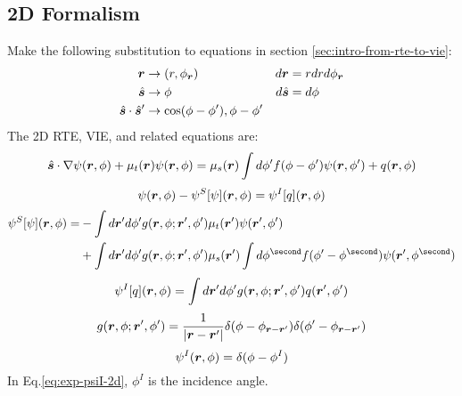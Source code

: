 \documentclass [10pt,letterpaper]{article}
\renewcommand{\vec}{\vectorsym}
\newcommand{\unitvec}[1]{\hat{\vec{#1}}}
\newcommand{\grad}{\nabla}
\begin{document}
\subsection{2D Formalism}
\label{sub:2d-formalism}
Make the following substitution to equations in section \ref{sec:intro-from-rte-to-vie}:
\begin{align*}
	\vec{r} & \rightarrow(r,\phi_{\vec{r}}) & d\vec{r} &= r dr d\phi_{\vec{r}} \\
	\unitvec{s} & \rightarrow\phi & d\unitvec{s} &= d\phi \\
	\unitvec{s}\cdot\unitvec{s}^\prime & \rightarrow \cos(\phi-\phi^\prime), \phi-\phi^\prime
\end{align*}
The 2D RTE, VIE, and related equations are:
\begin{equation} \label{eq:def-rte-2d}
	\unitvec{s}\cdot\grad\psi(\vec{r},\phi)
	+\mu_t(\vec{r})\psi(\vec{r},\phi)
	=\mu_s(\vec{r})\int d\phi^\prime f(\phi-\phi^\prime)\psi(\vec{r},\phi^\prime)
	+q(\vec{r},\phi)
\end{equation}
\begin{equation} \label{eq:short-vie-2d}
	\psi(\vec{r},\phi)
	-\psi^S[\psi](\vec{r},\phi)
	=\psi^I[q](\vec{r},\phi)
\end{equation}
\begin{equation} \label{eq:def-psiS-2d}
	\begin{split}
		\psi^S[\psi](\vec{r},\phi)=
		&-\int d\vec{r}^\prime d\phi^\prime
		g(\vec{r},\phi;\vec{r}^\prime,\phi^\prime)
		\mu_t(\vec{r}^\prime) \psi(\vec{r}^\prime,\phi^\prime)
		\\ 
		&+\int d\vec{r}^\prime d\phi^\prime
		g(\vec{r},\phi;\vec{r}^\prime,\phi^\prime)
		\mu_s(\vec{r}^\prime)
		\int d\phi^\second
		f(\phi^\prime-\phi^\second) \psi(\vec{r}^\prime,\phi^\second)
	\end{split}
\end{equation}
\begin{equation} \label{eq:def-psiI-2d}
	\psi^I[q](\vec{r},\phi)=
	\int d\vec{r}^\prime d\phi^\prime
	g(\vec{r},\phi;\vec{r}^\prime,\phi^\prime)
	q(\vec{r}^\prime,\phi^\prime)
\end{equation}
\begin{equation} \label{eq:exp-gf-2d}
	g(\vec{r},\phi;\vec{r}^\prime,\phi^\prime)
	=
	\frac{1}{\lvert\vec{r}-\vec{r}^\prime\rvert}
	\delta(\phi-\phi_{\vec{r}-\vec{r}^\prime})
	\delta(\phi^\prime-\phi_{\vec{r}-\vec{r}^\prime})
\end{equation}
\begin{equation} \label{eq:exp-psiI-2d}
	\psi^I(\vec{r},\phi) = \delta(\phi-\phi^I) 
\end{equation}
In Eq.\eqref{eq:exp-psiI-2d}, $\phi^I$ is the incidence angle.
\end{document}
